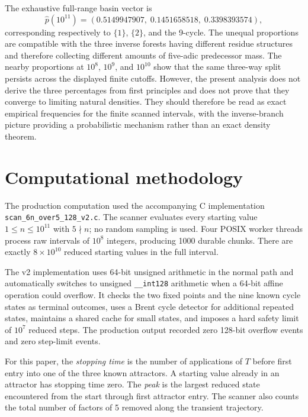 \documentclass[11pt]{article}
\begin{document}
The exhaustive full-range basin vector is
\begin{equation}
\widehat p(10^{11})=(0.5149947907,\;0.1451658518,\;0.3398393574),
\end{equation}
corresponding respectively to $\{1\}$, $\{2\}$, and the 9-cycle. The unequal proportions are compatible with the three inverse forests having different residue structures and therefore collecting different amounts of five-adic predecessor mass. The nearby proportions at $10^8$, $10^9$, and $10^{10}$ show that the same three-way split persists across the displayed finite cutoffs. However, the present analysis does not derive the three percentages from first principles and does not prove that they converge to limiting natural densities. They should therefore be read as exact empirical frequencies for the finite scanned intervals, with the inverse-branch picture providing a probabilistic mechanism rather than an exact density theorem.

\section{Computational methodology}
The production computation used the accompanying C implementation \texttt{scan\_6n\_over5\_128\_v2.c}. The scanner evaluates every starting value $1\le n\le10^{11}$ with $5\nmid n$; no random sampling is used. Four POSIX worker threads process raw intervals of $10^8$ integers, producing 1000 durable chunks. There are exactly $8\times10^{10}$ reduced starting values in the full interval.

The v2 implementation uses 64-bit unsigned arithmetic in the normal path and automatically switches to unsigned \texttt{\_\_int128} arithmetic when a 64-bit affine operation could overflow. It checks the two fixed points and the nine known cycle states as terminal outcomes, uses a Brent cycle detector for additional repeated states, maintains a shared cache for small states, and imposes a hard safety limit of $10^7$ reduced steps. The production output recorded zero 128-bit overflow events and zero step-limit events.

For this paper, the \emph{stopping time} is the number of applications of $T$ before first entry into one of the three known attractors. A starting value already in an attractor has stopping time zero. The \emph{peak} is the largest reduced state encountered from the start through first attractor entry. The scanner also counts the total number of factors of 5 removed along the transient trajectory.
\end{document}
